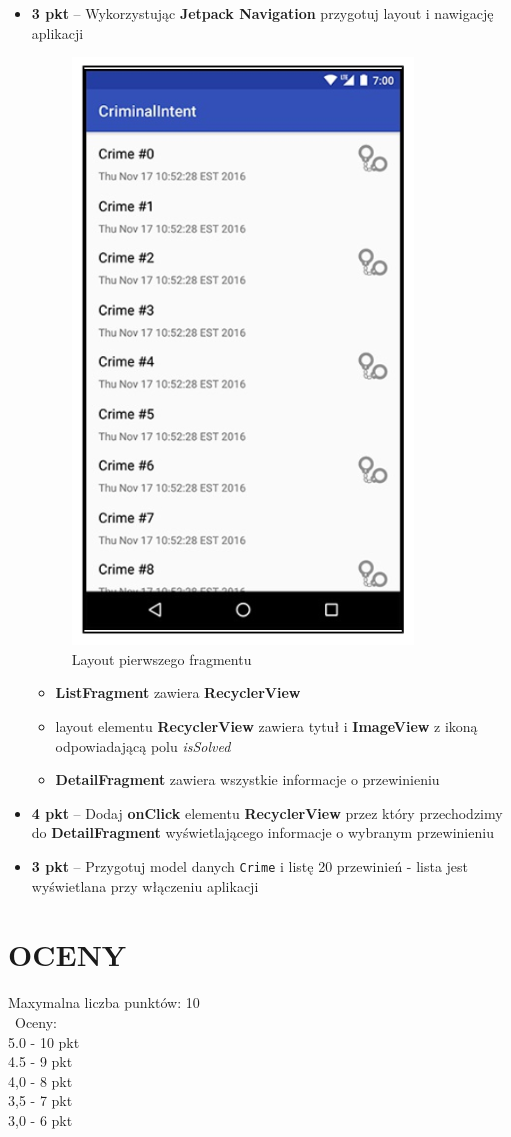 \documentclass[a4paper]{article}
\begin{document}
\begin{itemize}
\item \textbf{3 pkt} -- Wykorzystując \textbf{Jetpack Navigation} przygotuj layout i nawigację aplikacji

\begin{figure}[h]
\centering
\caption{Layout pierwszego fragmentu}
\includegraphics[scale=0.7]{l2.png}
\end{figure}

\begin{itemize}

\item \textbf{ListFragment} zawiera \textbf{RecyclerView}
\item layout elementu \textbf{RecyclerView} zawiera tytuł i \textbf{ImageView} z ikoną odpowiadającą polu \textit{isSolved}
\item \textbf{DetailFragment} zawiera wszystkie informacje o przewinieniu
\end{itemize}

\item \textbf{4 pkt} -- Dodaj \textbf{onClick} elementu  \textbf{RecyclerView} przez który przechodzimy do \textbf{DetailFragment} wyświetlającego informacje o wybranym przewinieniu

\item \textbf{3 pkt} -- Przygotuj model danych \verb+Crime+ i listę 20 przewinień - lista jest wyświetlana przy włączeniu aplikacji
\end{itemize}

\section*{OCENY}
Maxymalna liczba punktów: 10\\\
Oceny:\\
5.0 - 10 pkt\\
4.5 - 9 pkt\\
4,0 - 8 pkt\\
3,5 - 7 pkt\\
3,0 - 6 pkt
\end{document}

